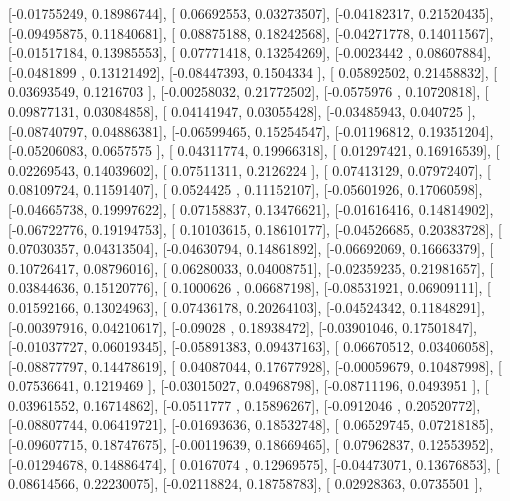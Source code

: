 \documentclass{article}
\begin{document}
       [-0.01755249,  0.18986744],
       [ 0.06692553,  0.03273507],
       [-0.04182317,  0.21520435],
       [-0.09495875,  0.11840681],
       [ 0.08875188,  0.18242568],
       [-0.04271778,  0.14011567],
       [-0.01517184,  0.13985553],
       [ 0.07771418,  0.13254269],
       [-0.0023442 ,  0.08607884],
       [-0.0481899 ,  0.13121492],
       [-0.08447393,  0.1504334 ],
       [ 0.05892502,  0.21458832],
       [ 0.03693549,  0.1216703 ],
       [-0.00258032,  0.21772502],
       [-0.0575976 ,  0.10720818],
       [ 0.09877131,  0.03084858],
       [ 0.04141947,  0.03055428],
       [-0.03485943,  0.040725  ],
       [-0.08740797,  0.04886381],
       [-0.06599465,  0.15254547],
       [-0.01196812,  0.19351204],
       [-0.05206083,  0.0657575 ],
       [ 0.04311774,  0.19966318],
       [ 0.01297421,  0.16916539],
       [ 0.02269543,  0.14039602],
       [ 0.07511311,  0.2126224 ],
       [ 0.07413129,  0.07972407],
       [ 0.08109724,  0.11591407],
       [ 0.0524425 ,  0.11152107],
       [-0.05601926,  0.17060598],
       [-0.04665738,  0.19997622],
       [ 0.07158837,  0.13476621],
       [-0.01616416,  0.14814902],
       [-0.06722776,  0.19194753],
       [ 0.10103615,  0.18610177],
       [-0.04526685,  0.20383728],
       [ 0.07030357,  0.04313504],
       [-0.04630794,  0.14861892],
       [-0.06692069,  0.16663379],
       [ 0.10726417,  0.08796016],
       [ 0.06280033,  0.04008751],
       [-0.02359235,  0.21981657],
       [ 0.03844636,  0.15120776],
       [ 0.1000626 ,  0.06687198],
       [-0.08531921,  0.06909111],
       [ 0.01592166,  0.13024963],
       [ 0.07436178,  0.20264103],
       [-0.04524342,  0.11848291],
       [-0.00397916,  0.04210617],
       [-0.09028   ,  0.18938472],
       [-0.03901046,  0.17501847],
       [-0.01037727,  0.06019345],
       [-0.05891383,  0.09437163],
       [ 0.06670512,  0.03406058],
       [-0.08877797,  0.14478619],
       [ 0.04087044,  0.17677928],
       [-0.00059679,  0.10487998],
       [ 0.07536641,  0.1219469 ],
       [-0.03015027,  0.04968798],
       [-0.08711196,  0.0493951 ],
       [ 0.03961552,  0.16714862],
       [-0.0511777 ,  0.15896267],
       [-0.0912046 ,  0.20520772],
       [-0.08807744,  0.06419721],
       [-0.01693636,  0.18532748],
       [ 0.06529745,  0.07218185],
       [-0.09607715,  0.18747675],
       [-0.00119639,  0.18669465],
       [ 0.07962837,  0.12553952],
       [-0.01294678,  0.14886474],
       [ 0.0167074 ,  0.12969575],
       [-0.04473071,  0.13676853],
       [ 0.08614566,  0.22230075],
       [-0.02118824,  0.18758783],
       [ 0.02928363,  0.0735501 ],
\end{document}
